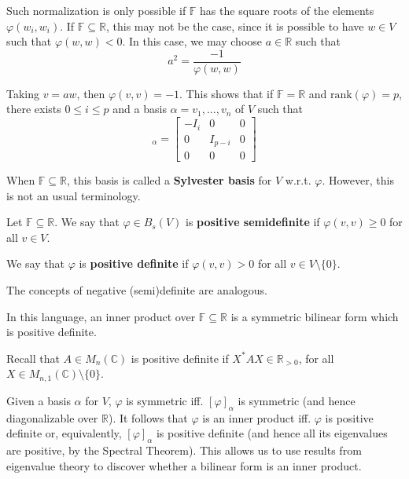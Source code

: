 Such normalization is only possible if $\mathbb{F}$ has the square roots of the elements $\varphi(w_i, w_i)$. If $\mathbb{F} \subseteq \mathbb{R}$, this may not be the case, since it is possible to have $w \in V$ such that $\varphi(w,w) < 0$. In this case, we may choose $a \in \mathbb{R}$ such that \[ a^2 = \frac{-1}{\varphi(w,w)} \]  

Taking $v = aw$, then $\varphi(v,v) = -1$. This shows that if $\mathbb{F} = \mathbb{R}$ and $\text{rank}(\varphi) = p$, there exists $0 \leq i \leq p$ and a basis $\alpha = v_1, \ldots, v_n$ of $V$ such that 
\begin{equation*} 
  [\varphi]_\alpha = \begin{bmatrix}
    -I_i & 0 & 0 \\
    0 & I_{p-i} & 0 \\
    0 & 0 & 0 
  \end{bmatrix}
  \label{eq:202301020915}
\end{equation*}

\begin{definition}
When $\mathbb{F} \subseteq \mathbb{R}$, this basis is called a \textbf{Sylvester basis} for $V$ w.r.t. $\varphi$. However, this is not an usual terminology. 
\end{definition}

\begin{definition} 
Let $\mathbb{F} \subseteq \mathbb{R}$. We say that $\varphi \in B_s(V)$ is \textbf{positive semidefinite} if $\varphi(v,v) \geq 0$ for all $v \in V$. 

We say that $\varphi$ is \textbf{positive definite} if $\varphi(v,v) > 0$ for all $v \in V \setminus \{ 0 \}$.
\end{definition}

The concepts of negative (semi)definite are analogous. 

In this language, an inner product over $\mathbb{F} \subseteq \mathbb{R}$ is a symmetric bilinear form which is positive definite.

Recall that $A \in M_n(\mathbb{C})$ is positive definite if $X^\ast A X \in \mathbb{R}_{> 0}$, for all $X \in M_{n,1}(\mathbb{C}) \setminus \{ 0 \}$.

Given a basis $\alpha$ for $V$, $\varphi$ is symmetric iff. $[\varphi]_\alpha$ is symmetric (and hence diagonalizable over $\mathbb{R}$). It follows that $\varphi$ is an inner product iff. $\varphi$ is positive definite or, equivalently, $[\varphi]_\alpha$ is positive definite (and hence all its eigenvalues are positive, by the Spectral Theorem). This allows us to use results from eigenvalue theory to discover whether a bilinear form is an inner product. 

